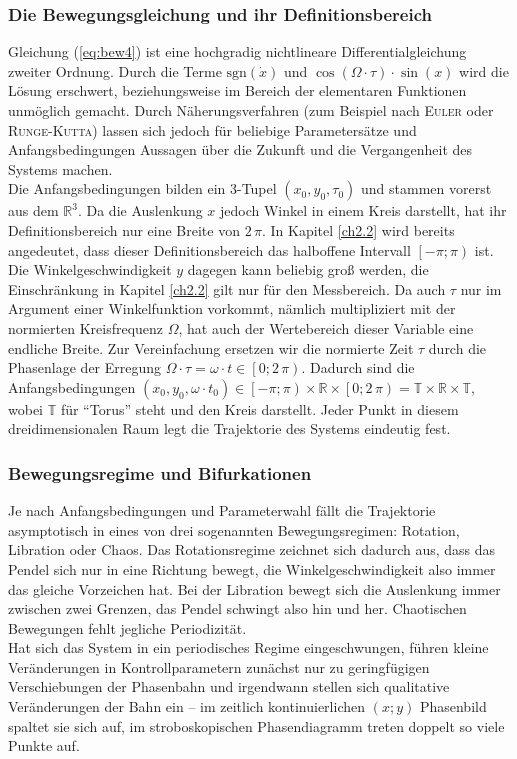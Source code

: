 \documentclass[numbers=noenddot,12pt,a4paper]{scrartcl}
\newcommand{\ix}[1]{_\text{#1}}
\newcommand{\signum}{\text{sgn}}
\begin{document}
\subsubsection{Die Bewegungsgleichung und ihr Definitionsbereich}
Gleichung (\ref{eq:bew4}) ist eine hochgradig nichtlineare Differentialgleichung zweiter Ordnung. Durch die Terme $\signum\left(\dot{x}\right)$ und $\cos\left(\Omega\cdot\tau\right)\cdot\sin\left(x\right)$ wird die Lösung erschwert, beziehungsweise im Bereich der elementaren Funktionen unmöglich gemacht. Durch Näherungsverfahren (zum Beispiel nach \textsc{Euler} oder \textsc{Runge}-\textsc{Kutta}) lassen sich jedoch für beliebige Parametersätze und Anfangsbedingungen Aussagen über die Zukunft und die Vergangenheit des Systems machen.\\
Die Anfangsbedingungen bilden ein 3-Tupel $(x\ix{0},y\ix{0},\tau\ix{0})$ und stammen vorerst aus dem $\mathbb{R}^3$. Da die Auslenkung $x$ jedoch Winkel in einem Kreis darstellt, hat ihr Definitionsbereich nur eine Breite von $2\,\pi$. In Kapitel \ref{ch2.2} wird bereits angedeutet, dass dieser Definitionsbereich das halboffene Intervall $\left[-\pi;\pi\right)$ ist. Die Winkelgeschwindigkeit $y$ dagegen kann beliebig groß werden, die Einschränkung in Kapitel \ref{ch2.2} gilt nur für den Messbereich. Da auch $\tau$ nur im Argument einer Winkelfunktion vorkommt, nämlich multipliziert mit der normierten Kreisfrequenz $\Omega$, hat auch der Wertebereich dieser Variable eine endliche Breite. Zur Vereinfachung ersetzen wir die normierte Zeit $\tau$ durch die Phasenlage der Erregung $\Omega\cdot\tau=\omega\cdot t\in\left[0;2\,\pi\right)$. Dadurch sind die Anfangsbedingungen $(x\ix{0},y\ix{0},\omega\cdot t\ix{0})\in\left[-\pi;\pi\right)\times\mathbb{R}\times\left[0;2\,\pi\right)=\mathbb{T}\times\mathbb{R}\times\mathbb{T}$, wobei $\mathbb{T}$ für "`Torus"' steht und den Kreis darstellt. Jeder Punkt in diesem dreidimensionalen Raum legt die Trajektorie des Systems eindeutig fest.
\subsubsection{Bewegungsregime und Bifurkationen}
Je nach Anfangsbedingungen und Parameterwahl fällt die Trajektorie asymptotisch in eines von drei sogenannten Bewegungsregimen: Rotation, Libration oder Chaos. Das Rotationsregime zeichnet sich dadurch aus, dass das Pendel sich nur in eine Richtung bewegt, die Winkelgeschwindigkeit also immer das gleiche Vorzeichen hat. Bei der Libration bewegt sich die Auslenkung immer zwischen zwei Grenzen, das Pendel schwingt also hin und her. Chaotischen Bewegungen fehlt jegliche Periodizität.\\
Hat sich das System in ein periodisches Regime eingeschwungen, führen kleine Veränderungen in Kontrollparametern zunächst nur zu geringfügigen Verschiebungen der Phasenbahn und irgendwann stellen sich qualitative Veränderungen der Bahn ein -- im zeitlich kontinuierlichen $(x;y)$ Phasenbild spaltet sie sich auf, im stroboskopischen Phasendiagramm treten doppelt so viele Punkte auf.
\end{document}
